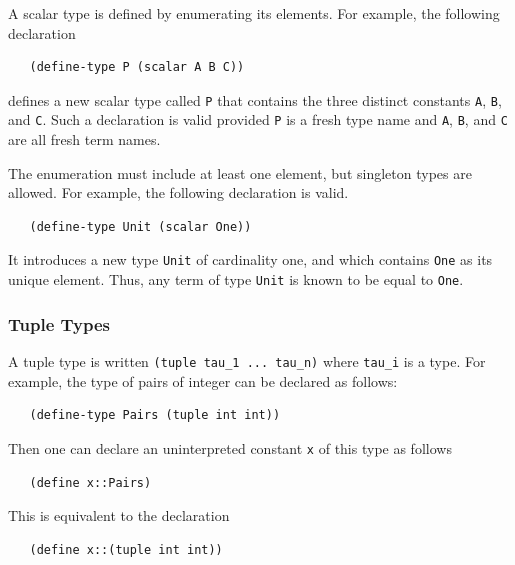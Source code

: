 \documentclass[11pt,twoside,fleqn,openright,titlepage]{cslreport}
\begin{document}
A scalar type is defined by enumerating its elements. For example, the
following declaration
\begin{small}
\begin{verbatim}
   (define-type P (scalar A B C))
\end{verbatim}
\end{small}
defines a  new scalar type  called \texttt{P} that contains  the three
distinct  constants  \texttt{A}, \texttt{B},  and  \texttt{C}. Such  a
declaration  is valid  provided \texttt{P}  is a  fresh type  name and
\texttt{A}, \texttt{B}, and \texttt{C} are all fresh term names.

\medskip\noindent The enumeration must include at least one element,
but  singleton   types  are   allowed.  For  example,   the  following
declaration is valid.
\begin{small}
\begin{verbatim}
   (define-type Unit (scalar One))
\end{verbatim}
\end{small}
It introduces a  new type \texttt{Unit} of cardinality  one, and which
contains \texttt{One}  as its unique  element. Thus, any term  of type
\texttt{Unit} is known to be equal to \texttt{One}.


\subsubsection*{Tuple Types}

A tuple  type is written \texttt{(tuple tau\_1  ... tau\_n)} where
\texttt{tau\_i} is a type. For example, the type of pairs of integer
can be declared as follows:
\begin{small}
\begin{verbatim}
   (define-type Pairs (tuple int int))
\end{verbatim}
\end{small}
Then one can declare an uninterpreted constant \texttt{x} of this type
as follows
\begin{small}
\begin{verbatim}
   (define x::Pairs)
\end{verbatim}
\end{small}
This is equivalent to the declaration
\begin{small}
\begin{verbatim}
   (define x::(tuple int int))
\end{verbatim}
\end{small}
\end{document}
